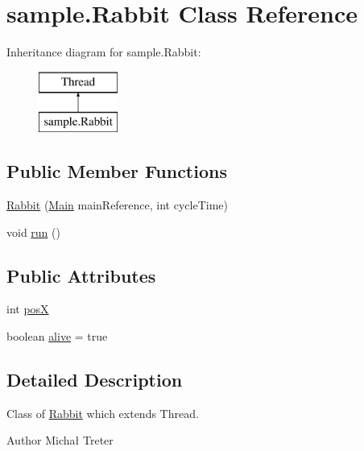 \hypertarget{classsample_1_1_rabbit}{}\section{sample.\+Rabbit Class Reference}
\label{classsample_1_1_rabbit}
Inheritance diagram for sample.\+Rabbit\+:\begin{figure}[H]
\begin{center}
\leavevmode
\includegraphics[height=2.000000cm]{classsample_1_1_rabbit}
\end{center}
\end{figure}
\subsection*{Public Member Functions}
\begin{DoxyCompactItemize}
\item 
\hyperlink{classsample_1_1_rabbit_a58fe416b0776f6dfcca2f887bb910fe7}{Rabbit} (\hyperlink{classsample_1_1_main}{Main} main\+Reference, int cycle\+Time)
\item 
void \hyperlink{classsample_1_1_rabbit_a517b66c50187ce9ba430c9aea1b3be40}{run} ()
\end{DoxyCompactItemize}
\subsection*{Public Attributes}
\begin{DoxyCompactItemize}
\item 
int \hyperlink{classsample_1_1_rabbit_a867c7d181eeb7fb853b402d9e1c897aa}{posX}
\item 
boolean \hyperlink{classsample_1_1_rabbit_a4ad80bc5cede7a56637f547de111e456}{alive} = true
\end{DoxyCompactItemize}


\subsection{Detailed Description}
Class of \hyperlink{classsample_1_1_rabbit}{Rabbit} which extends Thread. \begin{DoxyAuthor}{Author}
Michał Treter 
\end{DoxyAuthor}


